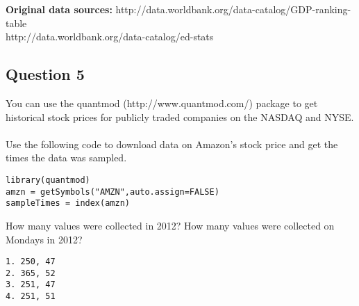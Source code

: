 \documentclass[]{article}
\begin{document}
\textbf{Original data sources: }
http://data.worldbank.org/data-catalog/GDP-ranking-table \\
http://data.worldbank.org/data-catalog/ed-stats \\
\newpage
\subsection*{Question 5}
You can use the quantmod (http://www.quantmod.com/) package to get historical stock prices for publicly traded companies on the NASDAQ and NYSE. \\
\\
Use the following code to download data on Amazon's stock price and get the times the data was sampled.
\begin{framed}
\begin{verbatim}
library(quantmod)
amzn = getSymbols("AMZN",auto.assign=FALSE)
sampleTimes = index(amzn) 
\end{verbatim}
\end{framed}
How many values were collected in 2012? How many values were collected on Mondays in 2012?
\begin{verbatim}
1. 250, 47
2. 365, 52
3. 251, 47
4. 251, 51
\end{verbatim}
\end{document}
